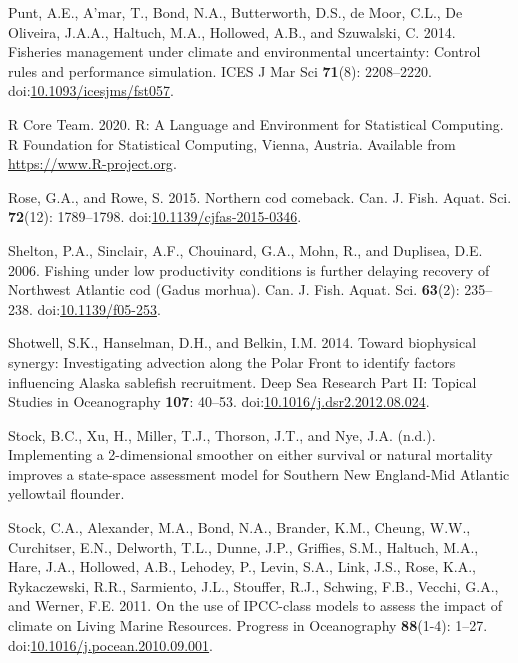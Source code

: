 \documentclass[]{article}
\begin{document}
\leavevmode\hypertarget{ref-punt2014Fisheries}{}%
Punt, A.E., A'mar, T., Bond, N.A., Butterworth, D.S., de Moor, C.L., De
Oliveira, J.A.A., Haltuch, M.A., Hollowed, A.B., and Szuwalski, C. 2014.
Fisheries management under climate and environmental uncertainty:
Control rules and performance simulation. ICES J Mar Sci \textbf{71}(8):
2208--2220.
doi:\href{https://doi.org/10.1093/icesjms/fst057}{10.1093/icesjms/fst057}.

\leavevmode\hypertarget{ref-rcoreteam2020Language}{}%
R Core Team. 2020. R: A Language and Environment for Statistical
Computing. R Foundation for Statistical Computing, Vienna, Austria.
Available from \url{https://www.R-project.org}.

\leavevmode\hypertarget{ref-rose2015Northern}{}%
Rose, G.A., and Rowe, S. 2015. Northern cod comeback. Can. J. Fish.
Aquat. Sci. \textbf{72}(12): 1789--1798.
doi:\href{https://doi.org/10.1139/cjfas-2015-0346}{10.1139/cjfas-2015-0346}.

\leavevmode\hypertarget{ref-shelton2006Fishing}{}%
Shelton, P.A., Sinclair, A.F., Chouinard, G.A., Mohn, R., and Duplisea,
D.E. 2006. Fishing under low productivity conditions is further delaying
recovery of Northwest Atlantic cod (Gadus morhua). Can. J. Fish. Aquat.
Sci. \textbf{63}(2): 235--238.
doi:\href{https://doi.org/10.1139/f05-253}{10.1139/f05-253}.

\leavevmode\hypertarget{ref-shotwell2014Biophysical}{}%
Shotwell, S.K., Hanselman, D.H., and Belkin, I.M. 2014. Toward
biophysical synergy: Investigating advection along the Polar Front to
identify factors influencing Alaska sablefish recruitment. Deep Sea
Research Part II: Topical Studies in Oceanography \textbf{107}: 40--53.
doi:\href{https://doi.org/10.1016/j.dsr2.2012.08.024}{10.1016/j.dsr2.2012.08.024}.

\leavevmode\hypertarget{ref-stockthisissueImplementing}{}%
Stock, B.C., Xu, H., Miller, T.J., Thorson, J.T., and Nye, J.A. (n.d.).
Implementing a 2-dimensional smoother on either survival or natural
mortality improves a state-space assessment model for Southern New
England-Mid Atlantic yellowtail flounder.

\leavevmode\hypertarget{ref-stock2011Use}{}%
Stock, C.A., Alexander, M.A., Bond, N.A., Brander, K.M., Cheung, W.W.,
Curchitser, E.N., Delworth, T.L., Dunne, J.P., Griffies, S.M., Haltuch,
M.A., Hare, J.A., Hollowed, A.B., Lehodey, P., Levin, S.A., Link, J.S.,
Rose, K.A., Rykaczewski, R.R., Sarmiento, J.L., Stouffer, R.J., Schwing,
F.B., Vecchi, G.A., and Werner, F.E. 2011. On the use of IPCC-class
models to assess the impact of climate on Living Marine Resources.
Progress in Oceanography \textbf{88}(1-4): 1--27.
doi:\href{https://doi.org/10.1016/j.pocean.2010.09.001}{10.1016/j.pocean.2010.09.001}.
\end{document}
